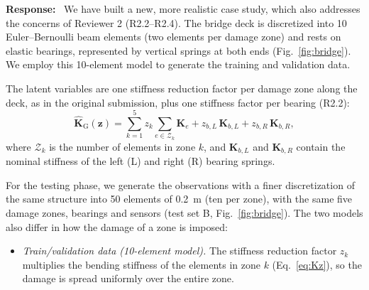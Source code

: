 \documentclass[11pt]{article}
\newenvironment{response}{\par\smallskip\noindent\color{resp}\textbf{Response:}\ }{\par}
\newcommand{\z}{\mathbf{z}}
\begin{document}
\begin{response}
We have  built a new, more realistic case study, which also addresses the
concerns of Reviewer 2 (R2.2--R2.4). The bridge deck is discretized into 10 Euler--Bernoulli beam elements (two elements per damage zone) and rests on elastic bearings, represented by vertical springs at both ends (Fig.~\ref{fig:bridge}). 
We employ this 10-element model to generate the training and validation data.

The latent variables are one stiffness reduction factor per damage zone along the deck, as in the original submission, plus one stiffness factor per bearing (R2.2):
\begin{equation}
\hat{\mathbf{K}}_{\mathrm{G}}(\z)=\sum_{k=1}^{5} z_k\sum_{e\in\mathcal{Z}_k}\mathbf{K}_{e}
+z_{b,L}\,\mathbf{K}_{b,L}+z_{b,R}\,\mathbf{K}_{b,R},
\label{eq:Kz}
\end{equation}
where $\mathcal{Z}_k$ is the number of elements in zone $k$, and $\mathbf{K}_{b,L}$ and $\mathbf{K}_{b,R}$ contain the nominal stiffness of the left (L) and right (R) bearing springs.

For the testing phase, we generate the observations with a finer discretization of the same structure into 50 elements
of 0.2~m (ten per zone), with the same five damage zones, bearings and sensors (test set B, Fig.~\ref{fig:bridge}). The
two models also differ in how the damage of a zone is imposed:
\begin{itemize}[leftmargin=*]
\item \emph{Train/validation data (10-element model).} The stiffness reduction factor $z_k$ multiplies the bending stiffness of the elements in zone $k$ (Eq.~\eqref{eq:Kz}), so the damage is spread uniformly over the entire zone. 


\end{itemize}
\end{response}
\end{document}

